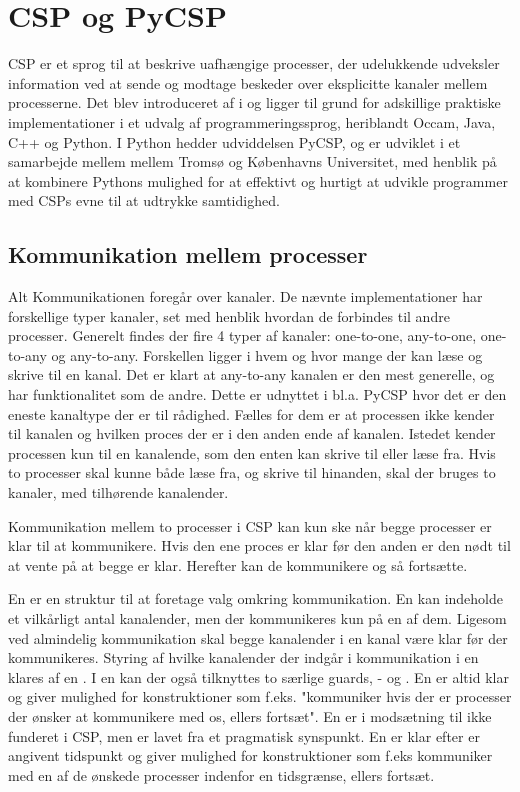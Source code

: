 \chapter{CSP og PyCSP}\label{sec:csp}
CSP er et sprog til at beskrive uafhængige processer, der udelukkende udveksler information ved at sende og modtage beskeder over eksplicitte kanaler mellem processerne. Det blev introduceret af \citeauthor{hoare-csp} i \cite{hoare-csp} og ligger til grund for adskillige praktiske implementationer i et udvalg af programmeringssprog, heriblandt Occam, Java, C++ og Python\cite{May1983, jcsp, Brown2007, pycsp}. I Python hedder udviddelsen PyCSP, og er udviklet i et samarbejde mellem mellem Tromsø og Københavns Universitet, med henblik på at kombinere Pythons mulighed for at effektivt og hurtigt at udvikle programmer med CSPs evne til at udtrykke samtidighed\cite{pycsp}. 


\section{Kommunikation mellem processer}
Alt Kommunikationen foregår over kanaler. De nævnte implementationer har forskellige typer kanaler, set med henblik hvordan de forbindes til andre processer. Generelt findes der fire 4 typer af kanaler: one-to-one, any-to-one, one-to-any og any-to-any. Forskellen ligger i hvem og hvor mange der kan læse og skrive til en kanal. Det er klart at any-to-any kanalen er den mest generelle, og har funktionalitet som de andre. Dette er udnyttet i bl.a. PyCSP hvor det er den eneste kanaltype der er til rådighed. Fælles for dem er at processen ikke kender til kanalen og hvilken proces der er i den anden ende af kanalen. Istedet kender processen kun til en  kanalende, som  den enten kan skrive til eller læse fra. Hvis to processer skal kunne både læse fra, og skrive til hinanden, skal der bruges to kanaler, med tilhørende kanalender. 

Kommunikation mellem to processer i CSP kan kun ske når begge processer er klar til at kommunikere. Hvis den ene proces er klar før den anden er den nødt til at vente på at begge er klar. Herefter kan de kommunikere og så fortsætte.

En  er en struktur til at foretage valg omkring kommunikation. En  kan indeholde et vilkårligt antal kanalender, men der kommunikeres kun på en af dem. Ligesom ved almindelig kommunikation skal begge kanalender i en kanal være klar før der kommunikeres. Styring af hvilke kanalender der indgår i kommunikation i en   klares af en . I en  kan der også tilknyttes to særlige guards, - og . En  er altid klar og giver mulighed for konstruktioner som f.eks. "kommuniker hvis der er processer der ønsker at kommunikere med os, ellers fortsæt". En  er i modsætning til  ikke funderet i CSP, men er lavet fra et pragmatisk synspunkt. En  er klar efter er angivent tidspunkt og giver mulighed for konstruktioner som f.eks kommuniker med en af de ønskede processer indenfor en tidsgrænse, ellers fortsæt. 

